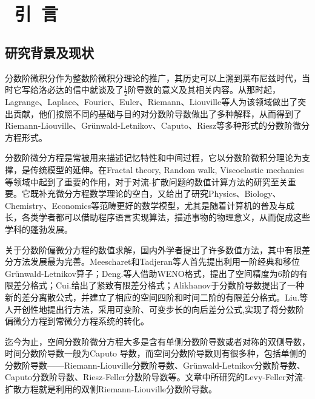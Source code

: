 \pagestyle{plain}
\newpage
\chapter{~引~言}\label{Chap:Introduction}

\section{研究背景及现状}
分数阶微积分作为整数阶微积分理论的推广，其历史可以上溯到莱布尼兹时代，当时它写给洛必达的信中就谈及了$\frac{1}{2}$阶导数的意义及其相关内容。从那时起，Lagrange、Laplace、Fourier、Euler、Riemann、Liouville等人为该领域做出了突出贡献，他们按照不同的基础与目的对分数阶导数做出了多种解释，从而得到了Riemann-Liouville、Grünwald-Letnikov、Caputo、Riesz等多种形式的分数阶微分方程形式。

分数阶微分方程是常被用来描述记忆特性和中间过程，它以分数阶微积分理论为支撑，是传统模型的延伸。在Fractal theory, Random walk, Viscoelastic mechanics等领域中起到了重要的作用，对于对流-扩散问题的数值计算方法的研究至关重要。它既补充微分方程数学理论的空白，又给出了研究Physics、Biology、Chemistry、Economics等范畴更好的数学模型，尤其是随着计算机的普及与成长，各类学者都可以借助程序语言实现算法，描述事物的物理意义，从而促成这些学科的蓬勃发展。

关于分数阶偏微分方程的数值求解，国内外学者提出了许多数值方法，其中有限差分方法发展最为完善。Meescharet和Tadjeran等人首先提出利用一阶经典和移位Grünwald-Letnikov算子；Deng.等人借助WENO格式，提出了空间精度为6阶的有限差分格式；Cui.给出了紧致有限差分格式；Alikhanov于分数阶导数提出了一种新的差分离散公式，并建立了相应的空间四阶和时间二阶的有限差分格式。Liu.等人开创性地提出行方法，采用可变阶、可变步长的向后差分公式,实现了将分数阶偏微分方程到常微分方程系统的转化\cite{lqx2007}。

迄今为止，空间分数阶微分方程大多是含有单侧分数阶导数或者对称的双侧导数，时间分数阶导数一般为Caputo 导数，而空间分数阶导数则有很多种，包括单侧的分数阶导数——Riemann-Liouville分数阶导数、Grünwald-Letnikov分数阶导数、Caputo分数阶导数、Riesz-Feller分数阶导数等\cite{lqx2007}。文章中所研究的Levy-Feller对流-扩散方程就是利用的双侧Riemann-Liouville分数阶导数。

